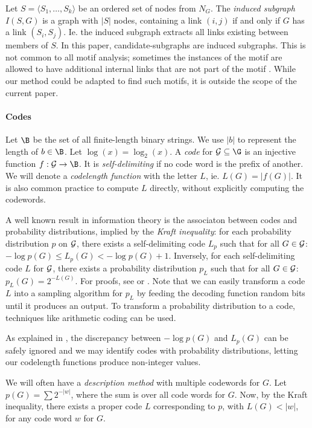 Let $S = \langle S_1, \ldots, S_k \rangle$ be an ordered set of nodes from $N_G$. The \emph{induced subgraph} $I(S, G)$ is a graph with $|S|$ nodes, containing a link  $(i, j)$ if and only if $G$ has a link $(S_i, S_j)$. Ie. the induced subgraph extracts all links existing between members of $S$. In this paper, candidate-subgraphs are induced subgraphs. This is not common to all motif analysis; sometimes the instances of the motif are allowed to have additional internal links that are not part of the motif \cite{chen2006nemofinder}. While our method could be adapted to find such motifs, it is outside the scope of the current paper.

\paragraph{Codes} Let $\B$ be the set of all finite-length binary strings. We use $|b|$ to represent the length of $b \in \B$. Let $\log(x) = \log_2(x)$. A \emph{code} for $\cal G \subseteq \G$ is an injective function $f: \cal G \to \B$. It is \emph{self-delimiting} if no code word is the prefix of another. We will denote a \emph{codelength function} with the letter $L$, ie. $L(G) = |f(G)|$. It is also common practice to compute $L$ directly, without explicitly computing the codewords.

A well known result in information theory is the associaton between codes and probability distributions, implied by the  \emph{Kraft inequality}: for each probability distribution $p$ on $\cal G$, there exists a self-delimiting code $L_p$ such that for all $G \in \cal G$: $- \log p(G) \leq L_p(G) < -\log p(G) + 1$. Inversely, for each self-delimiting code $L$ for $\cal G$, there exists a probability distribution $p_L$ such that for all $G \in \cal G$: $p_L(G) = 2^{-L(G)}$. For proofs, see \cite[Section~3.2.1]{grunwald2007minimum} or \cite[Theorem~5.2.1]{cover2006elements}. Note that we can easily transform a code $L$ into a sampling algorithm for $p_L$ by feeding the decoding function random bits until it produces an output. To transform a probability distribution to a code, techniques like arithmetic coding \cite{rissanen1979arithmetic} can be used. 

As explained in \cite[page 96]{grunwald2007minimum}, the discrepancy between $-\log p(G)$ and $L_p(G)$ can be safely ignored and we may identify codes with probability distributions, letting our codelength functions produce non-integer values. 

We will often have a \emph{description method} with multiple codewords for $G$. Let $p(G) = \sum 2^{-|w|}$, where the sum is over all code words for $G$. Now, by the Kraft inequality, there exists a proper code $L$ corresponding to $p$, with $L(G) < |w|$, for any code word $w$ for $G$.

